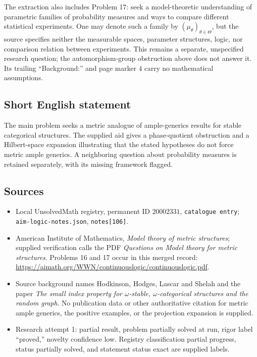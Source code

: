 \documentclass[11pt]{article}
\begin{document}
The extraction also includes Problem 17: seek a model-theoretic understanding of parametric families of probability measures and ways to compare different statistical experiments. One may denote such a family by $(\mu_\theta)_{\theta\in\Theta}$, but the source specifies neither the measurable spaces, parameter structures, logic, nor comparison relation between experiments. This remains a separate, unspecified research question; the automorphism-group obstruction above does not answer it. Its trailing ``Background:'' and page marker $4$ carry no mathematical assumptions.
\subsection{Short English statement}
The main problem seeks a metric analogue of ample-generics results for stable categorical structures. The supplied aid gives a phase-quotient obstruction and a Hilbert-space expansion illustrating that the stated hypotheses do not force metric ample generics. A neighboring question about probability measures is retained separately, with its missing framework flagged.
\subsection{Sources}
\begin{itemize}
\item Local UnsolvedMath registry, permanent ID $20002331$, \texttt{catalogue entry}; \texttt{aim-logic-notes.json}, \texttt{notes[106]}.
\item American Institute of Mathematics, \emph{Model theory of metric structures}; supplied verification calls the PDF \emph{Questions on Model theory for metric structures}. Problems 16 and 17 occur in this merged record: \url{https://aimath.org/WWN/continuouslogic/continuouslogic.pdf}.
\item Source background names Hodkinson, Hodges, Lascar and Shelah and the paper \emph{The small index property for $\omega$-stable, $\omega$-categorical structures and the random graph}. No publication data or other authoritative citation for metric ample generics, the positive examples, or the projection expansion is supplied.
\item Research attempt 1: partial result, problem partially solved at run, rigor label ``proved,'' novelty confidence low. Registry classification partial progress, status partially solved, and statement status exact are supplied labels.
\end{itemize}
\end{document}
